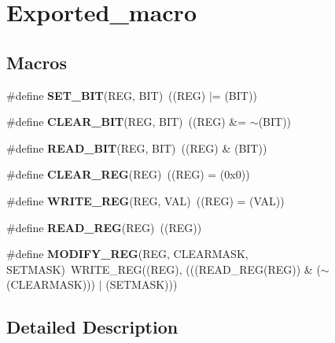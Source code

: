 \hypertarget{group___exported__macro}{}\section{Exported\+\_\+macro}
\label{group___exported__macro}
\subsection*{Macros}
\begin{DoxyCompactItemize}
\item 
\hypertarget{group___exported__macro_ga26474f43799fbade9cf300e21dd3a91a}{}\#define {\bfseries S\+E\+T\+\_\+\+B\+I\+T}(R\+E\+G,  B\+I\+T)~((R\+E\+G) $\vert$= (B\+I\+T))\label{group___exported__macro_ga26474f43799fbade9cf300e21dd3a91a}

\item 
\hypertarget{group___exported__macro_ga133aae6fc0d41bffab39ab223a7001de}{}\#define {\bfseries C\+L\+E\+A\+R\+\_\+\+B\+I\+T}(R\+E\+G,  B\+I\+T)~((R\+E\+G) \&= $\sim$(B\+I\+T))\label{group___exported__macro_ga133aae6fc0d41bffab39ab223a7001de}

\item 
\hypertarget{group___exported__macro_ga822bb1bb9710d5f2fa6396b84e583c33}{}\#define {\bfseries R\+E\+A\+D\+\_\+\+B\+I\+T}(R\+E\+G,  B\+I\+T)~((R\+E\+G) \& (B\+I\+T))\label{group___exported__macro_ga822bb1bb9710d5f2fa6396b84e583c33}

\item 
\hypertarget{group___exported__macro_ga1378fbdda39f40b85420df55f41460ef}{}\#define {\bfseries C\+L\+E\+A\+R\+\_\+\+R\+E\+G}(R\+E\+G)~((R\+E\+G) = (0x0))\label{group___exported__macro_ga1378fbdda39f40b85420df55f41460ef}

\item 
\hypertarget{group___exported__macro_ga32f78bffcaf6d13023dcd7f05e0c4d57}{}\#define {\bfseries W\+R\+I\+T\+E\+\_\+\+R\+E\+G}(R\+E\+G,  V\+A\+L)~((R\+E\+G) = (V\+A\+L))\label{group___exported__macro_ga32f78bffcaf6d13023dcd7f05e0c4d57}

\item 
\hypertarget{group___exported__macro_gae7f188a4d26c9e713a48414783421071}{}\#define {\bfseries R\+E\+A\+D\+\_\+\+R\+E\+G}(R\+E\+G)~((R\+E\+G))\label{group___exported__macro_gae7f188a4d26c9e713a48414783421071}

\item 
\hypertarget{group___exported__macro_ga6553c99f510c3bab8cc0a91602053247}{}\#define {\bfseries M\+O\+D\+I\+F\+Y\+\_\+\+R\+E\+G}(R\+E\+G,  C\+L\+E\+A\+R\+M\+A\+S\+K,  S\+E\+T\+M\+A\+S\+K)~W\+R\+I\+T\+E\+\_\+\+R\+E\+G((R\+E\+G), (((R\+E\+A\+D\+\_\+\+R\+E\+G(R\+E\+G)) \& ($\sim$(C\+L\+E\+A\+R\+M\+A\+S\+K))) $\vert$ (S\+E\+T\+M\+A\+S\+K)))\label{group___exported__macro_ga6553c99f510c3bab8cc0a91602053247}

\end{DoxyCompactItemize}


\subsection{Detailed Description}
